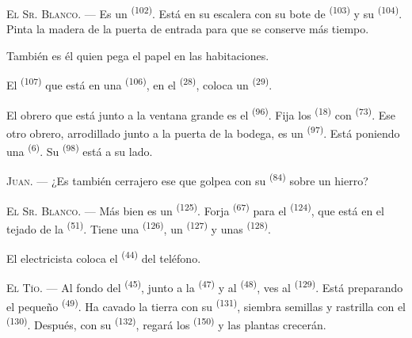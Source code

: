 \VUsaut{3.0mm}
\VUsaut{3.0mm}

\textsc{El Sr. Blanco}. --- Es un  \textsuperscript{(102)}. Está en su
escalera con su bote de  \textsuperscript{(103)} y su
 \textsuperscript{(104)}. Pinta la madera de la puerta de entrada
para que se conserve más tiempo.

También es él quien pega el papel en las habitaciones.

El  \textsuperscript{(107)} que está en una 
\textsuperscript{(106)}, en el  \textsuperscript{(28)}, coloca un
 \textsuperscript{(29)}.

El obrero que está junto a la ventana grande es el 
\textsuperscript{(96)}. Fija los  \textsuperscript{(18)} con
 \textsuperscript{(73)}. Ese otro obrero, arrodillado junto a la
puerta de la bodega, es un  \textsuperscript{(97)}. Está poniendo
una  \textsuperscript{(6)}. Su  \textsuperscript{(98)} está a
su lado.

\textsc{Juan}. --- ¿Es también cerrajero ese que golpea con su
 \textsuperscript{(84)} sobre un hierro?

\textsc{El Sr. Blanco}. --- Más bien es un  \textsuperscript{(125)}.
Forja  \textsuperscript{(67)} para el 
\textsuperscript{(124)}, que está en el tejado de la 
\textsuperscript{(51)}. Tiene una  \textsuperscript{(126)}, un
 \textsuperscript{(127)} y unas  \textsuperscript{(128)}.

El electricista coloca el  \textsuperscript{(44)} del
teléfono.

\VUsaut{3.0mm}

\textsc{El Tío}. --- Al fondo del  \textsuperscript{(45)}, junto a la
 \textsuperscript{(47)} y al  \textsuperscript{(48)}, ves al
 \textsuperscript{(129)}. Está preparando el pequeño
 \textsuperscript{(49)}. Ha cavado la tierra con su 
\textsuperscript{(131)}, siembra semillas y rastrilla con el 
\textsuperscript{(130)}. Después, con su  \textsuperscript{(132)}, regará
los  \textsuperscript{(150)} y las plantas crecerán.


